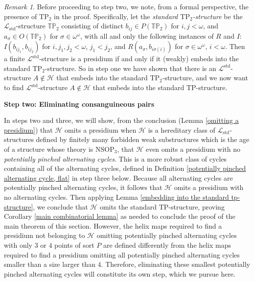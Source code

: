 \documentclass{amsart}
\theoremstyle{definition}
\theoremstyle{remark}
\newtheorem{remark}[theorem]{Remark}
\numberwithin{equation}{section}
\begin{document}
\begin{remark}
  \label{standard tp2-structure}  Before proceeding to step two, we note, from a formal perspective, the presence of $\mathrm{TP}_{2}$ in the proof. Specifically, let the \textit{standard $\mathrm{TP}_{2}$-structure} be the $\mathcal{L}_{\mathrm{std}}$-structure $\mathbb{TP}_{2}$ consisting of distinct $b_{ij} \in P(\mathbb{TP}_{2})$ for $i, j < \omega$, and $a_{\sigma} \in O(\mathbb{TP}_{2})$ for $\sigma \in \omega^{\omega}$, with all and only the following instances of $R$ and $I$: $I(b_{i j_{1}},b_{ij_{2}})$ for $i, j_{1}, j_{2} < \omega$, $j_{1} < j_{2}$, and $R(a_{\sigma}, b_{i\sigma(i)} )$ for $\sigma \in \omega^{\omega}$, $i < \omega$. Then a finite $\mathcal{L}^{\mathrm{std}}$-structure is a presidium if and only if it (weakly) embeds into the standard $\mathrm{TP}_{2}$-structure. So in step one we have shown that there is an $\mathcal{L}^{\mathrm{std}}$-structure $A \notin \mathcal{H}$ that embeds into the standard $\mathrm{TP}_{2}$-structure, and we now want to find $\mathcal{L}^{\mathrm{std}}$-structure $A \notin \mathcal{H}$ that embeds into the standard $\mathrm{TP}$-structure.
\end{remark}

\:

\textbf{Step two: Eliminating consanguineous pairs} 

In steps two and three, we will show, from the conclusion (Lemma \ref{omitting a presidium}) that $\mathcal{H}$ omits a presidium when $\mathcal{H}$ is a hereditary class of $\mathcal{L}_{\mathrm{std}}$-structures defined by finitely many forbidden weak substructures which is the age of a structure whose theory is $\mathrm{NSOP}_{3}$, that $\mathcal{H}$ even omits a presidium with no \textit{potentially pinched alternating cycles}. This is a more robust class of cycles containing all of the alternating cycles, defined in Definition \ref{potentially pinched alternating cycle, flat} in step three below. Because all alternating cycles are potentially pinched alternating cycles, it follows that $\mathcal{H}$ omits a presidium with no alternating cycles. Then applying Lemma \ref{embedding into the standard tp-structure}, we conclude that $\mathcal{H}$ omits the standard $\mathrm{TP}$-structure, proving Corollary \ref{main combinatorial lemma} as needed to conclude the proof of the main theorem of this section. However, the helix maps required to find a presidium not belonging to $\mathcal{H}$ omitting potentially pinched alternating cycles with only $3$ or $4$ points of sort $P$ are defined differently from the helix maps required to find a presidium omitting all potentially pinched alternating cycles smaller than a size larger than $4$. Therefore, eliminating these smallest potentially pinched alternating cycles will constitute its own step, which we pursue here.
\end{document}

